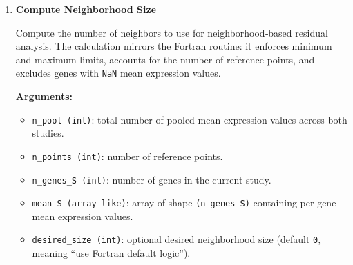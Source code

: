 \begin{enumerate}
        \textbf{Arguments:}
        \begin{itemize}
            \item \lstinline!pooled_means (array-like)!: 1D array of shape \lstinline!(pool_size)!, containing pre‑pooled mean expression values.
            \item \lstinline!pooled_perm (array-like)!: permutation vector of shape \lstinline!(pool_size)! that sorts \lstinline!pooled_means!.
            \item \lstinline!n_points (int)!: number of reference points to compute.
        \end{itemize}

        \textbf{Returns:}
        \begin{itemize}
            \item \lstinline!dict!: \{
                \lstinline!'n_pool': int!,  
                \lstinline!'x_star': np.ndarray (n_points,)!
            \}
        \end{itemize}

        \begin{lstlisting}[language=Python, caption={Pooling Means (Expert Interface)}]
out = tox_pool_means_expert(
    pooled_means,
    pooled_perm,
    n_points
)

n_pool = out["n_pool"]
x_star = out["x_star"]
        \end{lstlisting}

    \item \textbf{Compute Neighborhood Size}

        Compute the number of neighbors to use for neighborhood‑based residual analysis.  
        The calculation mirrors the Fortran routine: it enforces minimum and maximum limits, accounts for the number of reference points, and excludes genes with \lstinline!NaN! mean expression values.

        \textbf{Arguments:}
        \begin{itemize}
            \item \lstinline!n_pool (int)!: total number of pooled mean‑expression values across both studies.
            \item \lstinline!n_points (int)!: number of reference points.
            \item \lstinline!n_genes_S (int)!: number of genes in the current study.
            \item \lstinline!mean_S (array-like)!: array of shape \lstinline!(n_genes_S)! containing per‑gene mean expression values.
            \item \lstinline!desired_size (int)!: optional desired neighborhood size (default \lstinline!0!, meaning “use Fortran default logic”).
        \end{itemize}


\end{enumerate}
